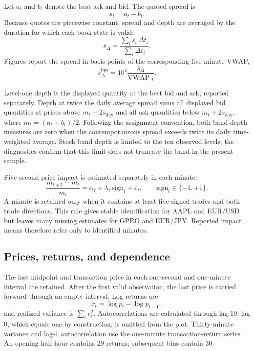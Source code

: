 \documentclass[11pt]{article}
\begin{document}
Let $a_t$ and $b_t$ denote the best ask and bid. The quoted spread is
\begin{equation}
  s_t=a_t-b_t.
\end{equation}
Because quotes are piecewise constant, spread and depth are averaged by the duration for which each book state is valid:
\begin{equation}
  \bar{s}_{\Delta}
  =\frac{\sum_i s_i\,\Delta t_i}{\sum_i \Delta t_i}.
\end{equation}
Figures report the spread in basis points of the corresponding five-minute VWAP,
\begin{equation}
  s_{\Delta}^{\mathrm{bps}}
  =10^4\frac{\bar{s}_{\Delta}}{\mathrm{VWAP}_{\Delta}}.
\end{equation}

Level-one depth is the displayed quantity at the best bid and ask, reported separately. Depth at twice the daily average spread sums all displayed bid quantities at prices above $m_t-2\bar{s}_{\mathrm{day}}$ and all ask quantities below $m_t+2\bar{s}_{\mathrm{day}}$, where $m_t=(a_t+b_t)/2$. Following the assignment convention, both band-depth measures are zero when the contemporaneous spread exceeds twice its daily time-weighted average. Stock band depth is limited to the ten observed levels; the diagnostics confirm that this limit does not truncate the band in the present sample.

Five-second price impact is estimated separately in each minute:
\begin{equation}
  \frac{m_{t+5}-m_t}{m_t}
  =\alpha_{\tau}+\lambda_{\tau}\,\mathrm{sign}_t+\varepsilon_t,
  \qquad \mathrm{sign}_t\in\{-1,+1\}.
\end{equation}
A minute is retained only when it contains at least five signed trades and both trade directions. This rule gives stable identification for AAPL and EUR/USD but leaves many missing estimates for GPRO and EUR/JPY. Reported impact means therefore refer only to identified minutes.

\subsection{Prices, returns, and dependence}

The last midpoint and transaction price in each one-second and one-minute interval are retained. After the first valid observation, the last price is carried forward through an empty interval. Log returns are
\begin{equation}
  r_t=\log p_t-\log p_{t-1},
\end{equation}
and realized variance is $\sum_t r_t^2$. Autocorrelations are calculated through lag 10; lag 0, which equals one by construction, is omitted from the plot. Thirty-minute variance and lag-1 autocorrelation use the one-minute transaction-return series. An opening half-hour contains 29 returns; subsequent bins contain 30.
\end{document}
